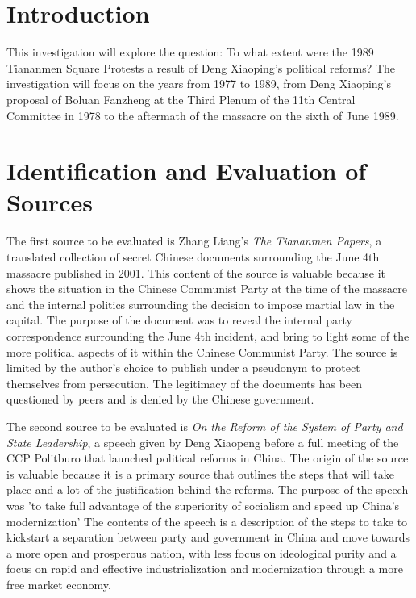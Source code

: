 \documentclass{paper}
\begin{document}
\insertTitlePage
\tableofcontents
\newpage
\setcounter{page}{1}

\section*{Introduction}
\begin{doublespace}
This investigation will explore the question: To what extent were the 1989 Tiananmen Square Protests a result of Deng Xiaoping's political reforms? The investigation will focus on the years from 1977 to 1989, from Deng Xiaoping's proposal of Boluan Fanzheng at the Third Plenum of the 11th Central Committee in 1978 to the aftermath of the massacre on the sixth of June 1989.
\end{doublespace}

\section{Identification and Evaluation of Sources}
\begin{doublespace}
The first source to be evaluated is Zhang Liang's \textit{The Tiananmen Papers}, a translated collection of secret Chinese documents surrounding the June 4th massacre published in 2001. This content of the source is valuable because it shows the situation in the Chinese Communist Party at the time of the massacre and the internal politics surrounding the decision to impose martial law in the capital. The purpose of the document was to reveal the internal party correspondence surrounding the June 4th incident, and bring to light some of the more political aspects of it within the Chinese Communist Party. The source is limited by the author's choice to publish under a pseudonym to protect themselves from persecution. The legitimacy of the documents has been questioned by peers and is denied by the Chinese government.

The second source to be evaluated is \textit{On the Reform of the System of Party and State Leadership}, a speech given by Deng Xiaopeng before a full meeting of the CCP Politburo that launched political reforms in China. The origin of the source is valuable because it is a primary source that outlines the steps that will take place and a lot of the justification behind the reforms. The purpose of the speech was 'to take full advantage of the superiority of socialism and speed up China's modernization' The contents of the speech is a description of the steps to take to kickstart a separation between party and government in China and move towards a more open and prosperous nation, with less focus on ideological purity and a focus on rapid and effective industrialization and modernization through a more free market economy.
\end{doublespace}
\end{document}

